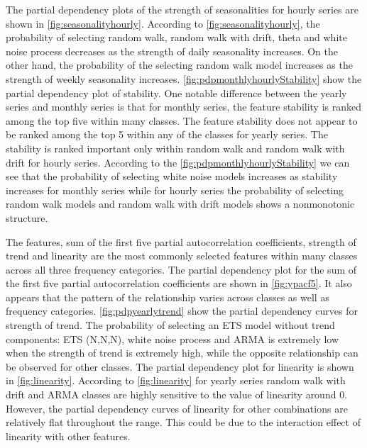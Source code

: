 \documentclass[11pt,a4paper,]{article}
\begin{document}
The partial dependency plots of the strength of seasonalities for hourly series are shown in \autoref{fig:seasonalityhourly}. According to \autoref{fig:seasonalityhourly}, the probability of selecting random walk, random walk with drift, theta and white noise process decreases as the strength of daily seasonality increases. On the other hand, the probability of the selecting random walk model increases as the strength of weekly seasonality increases.
\autoref{fig:pdpmonthlyhourlyStability} show the partial dependency plot of stability. One notable difference between the yearly series and monthly series is that for monthly series, the feature stability is ranked among the top five within many classes. The feature stability does not appear to be ranked among the top 5 within any of the classes for yearly series. The stability is ranked important only within random walk and random walk with drift for hourly series. According to the \autoref{fig:pdpmonthlyhourlyStability} we can see that the probability of selecting white noise models increases as stability increases for monthly series while for hourly series the probability of selecting random walk models and random walk with drift models shows a nonmonotonic structure.

The features, sum of the first five partial autocorrelation coefficients, strength of trend and linearity are the most commonly selected features within many classes across all three frequency categories. The partial dependency plot for the sum of the first five partial autocorrelation coefficients are shown in \autoref{fig:ypacf5}. It also appears that the pattern of the relationship varies across classes as well as frequency categories. \autoref{fig:pdpyearlytrend} show the partial dependency curves for strength of trend. The probability of selecting an ETS model without trend components: ETS (N,N,N), white noise process and ARMA is extremely low when the strength of trend is extremely high, while the opposite relationship can be observed for other classes. The partial dependency plot for linearity is shown in \autoref{fig:linearity}. According to \autoref{fig:linearity} for yearly series random walk with drift and ARMA classes are highly sensitive to the value of linearity around 0. However, the partial dependency curves of linearity for other combinations are relatively flat throughout the range. This could be due to the interaction effect of linearity with other features.
\end{document}
